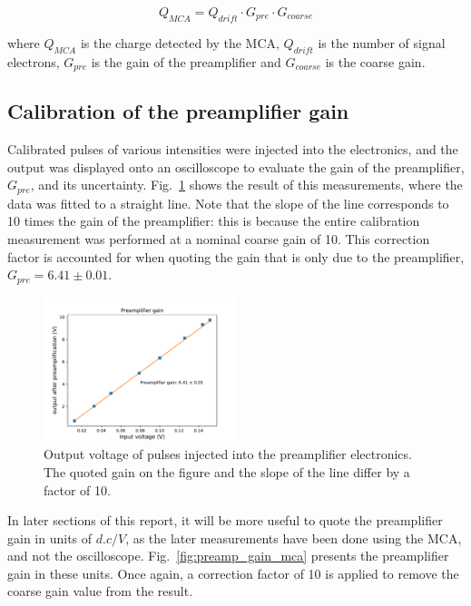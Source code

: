 \begin{equation}
  \label{eq:gain_system}
  Q_{MCA} = Q_{drift}\cdot G_{pre}\cdot G_{coarse}
\end{equation}

where $Q_{MCA}$ is the charge detected by the MCA, $Q_{drift}$ is the number of signal electrons, $G_{pre}$ is the gain of the preamplifier and $G_{coarse}$ is the coarse gain.

\subsection{Calibration of the preamp\-li\-fi\-er gain}
 Calibrated pulses of various intensities were injected into the electronics, and the output was displayed onto an oscilloscope to evaluate the gain of the preamplifier, $G_{pre}$, and its uncertainty. Fig.~\ref{fig:preamp_gain} shows the result of this measurements, where the data was fitted to a straight line. Note that the slope of the line corresponds to 10 times the gain of the preamplifier: this is because the entire calibration measurement was performed at a nominal coarse gain of 10. This correction factor is accounted for when quoting the gain that is only due to the preamplifier, $G_{pre} = 6.41 \pm 0.01$.

\begin{figure}[htb]
  \includegraphics[scale=0.5,width=0.5\textwidth]{graphics/preamp_gain_calibration.pdf}
  \caption{Output voltage of pulses injected into the preamplifier electronics. The quoted gain on the figure and the slope of the line differ by a factor of 10.}
  \label{fig:preamp_gain}
\end{figure}

In later sections of this report, it will be more useful to quote the preamplifier gain in units of $d.c/V$, as the later measurements have been done using the MCA, and not the oscilloscope. Fig.~\ref{fig:preamp_gain_mca} presents the preamplifier gain in these units. Once again, a correction factor of 10 is applied to remove the coarse gain value from the result.

